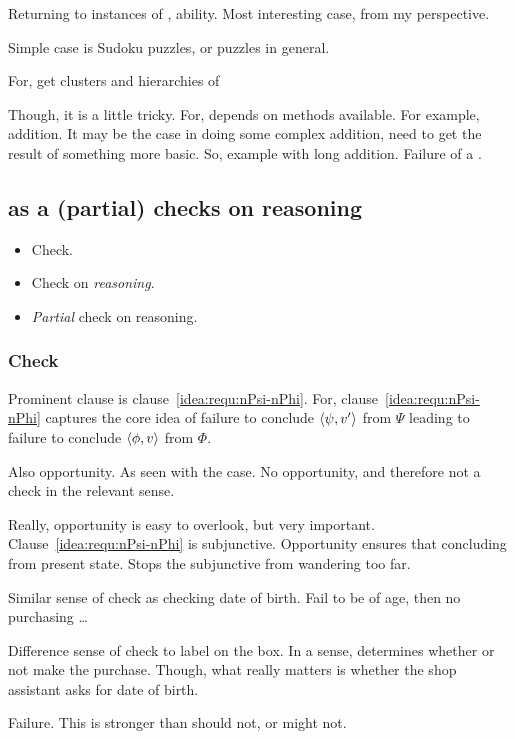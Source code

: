 \begin{note}
  Returning to instances of , ability.
  Most interesting case, from my perspective.

  Simple case is Sudoku puzzles, or puzzles in general.

  For, get clusters and hierarchies of 

  Though, it is a little tricky.
  For, depends on methods available.
  For example, addition.
  It may be the case in doing some complex addition, need to get the result of something more basic.
  So, example with long addition.
  Failure of a \requ{}.
\end{note}

\subsection{ as a (partial) checks on reasoning}
\label{cha:zS:sec:requs:checks}

\begin{note}
  \begin{itemize}
  \item Check.
  \item Check on \emph{reasoning}.
  \item \emph{Partial} check on reasoning.
  \end{itemize}
\end{note}

\subsubsection{Check}

\begin{note}[Check]
  Prominent clause is clause~\ref{idea:requ:nPsi-nPhi}.
  For, clause~\ref{idea:requ:nPsi-nPhi} captures the core idea of failure to conclude \(\langle \psi, v' \rangle\) from \(\Psi\) leading to failure to conclude \(\langle \phi, v \rangle\) from \(\Phi\).

  Also opportunity.
  As seen with the \citeauthor{Dretske:1970to} case.
  No opportunity, and therefore not a check in the relevant sense.

  Really, opportunity is easy to overlook, but very important.
  Clause~\ref{idea:requ:nPsi-nPhi} is subjunctive.
  Opportunity ensures that concluding from present state.
  Stops the subjunctive from wandering too far.

  Similar sense of check as checking date of birth.
  Fail to be of age, then no purchasing \dots

  Difference sense of check to label on the box.
  In a sense, determines whether or not make the purchase.
  Though, what really matters is whether the shop assistant asks for date of birth.

  Failure.
  This is stronger than should not, or might not.
\end{note}


